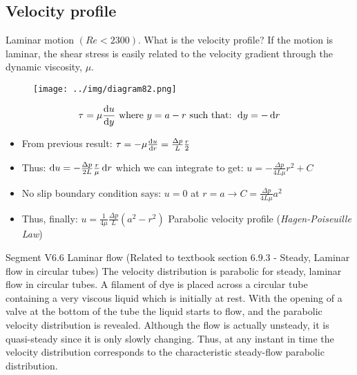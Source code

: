 \documentclass[class=report, crop=false, 12pt,a4paper]{standalone}
\begin{document}
\subsection{Velocity profile}
Laminar motion $\left(Re < 2300\right)$. What is the velocity profile? If the motion is laminar, the shear stress is easily related to the velocity gradient through the dynamic viscosity, $\mu$.
\begin{figure}[H]
  \centering
  \texttt{[image: ../img/diagram82.png]}
  \caption{}
\end{figure}
\begin{equation}
  \tau = \mu \frac{\dif u}{\dif y} \textrm{ where } y = a-r \textrm{ such that: } \dif y = -\dif r
\end{equation}
\begin{itemize}
  \item From previous result: $\tau = - \mu \frac{\dif u}{\dif r} = \frac{\Delta p}{L} \frac{r}{2}$
  \item Thus: $\dif u = - \frac{\Delta p}{2L} \frac{r}{\mu} \dif r$ which we can integrate to get: $u = - \frac{\Delta p}{4L\mu} r^2 + C$
  \item No slip boundary condition says: $u = 0$ at $ r = a \rightarrow C = \frac{\Delta p}{4 L \mu} a^2$
  \item Thus, finally: $u = \frac{1}{4\mu} \frac{\Delta p}{L} \left(a^2 - r^2\right)$ Parabolic velocity profile (\textit{Hagen-Poiseuille Law})
\end{itemize}
Segment V6.6 Laminar flow (Related to textbook section 6.9.3 - Steady, Laminar flow in circular tubes) The velocity distribution is parabolic for steady, laminar flow in circular tubes. A filament of dye is placed across a circular tube containing a very viscous liquid which is initially at rest. With the opening of a valve at the bottom of the tube the liquid starts to flow, and the parabolic velocity distribution is revealed. Although the flow is actually unsteady, it is quasi-steady since it is only slowly changing. Thus, at any instant in time the velocity distribution corresponds to the characteristic steady-flow parabolic distribution.
\end{document}
